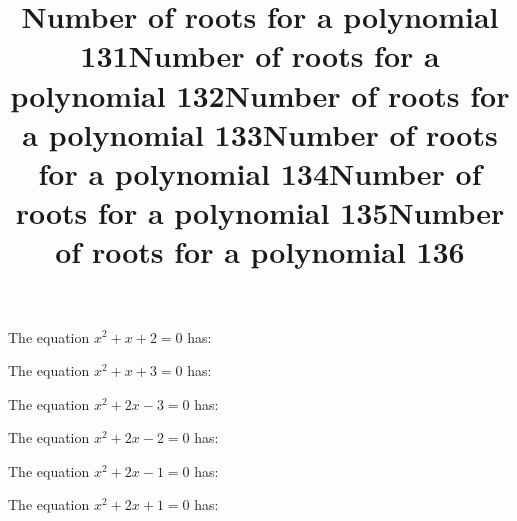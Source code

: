 \documentclass{article}
\begin{document}
\begin{category}
\begin{question}[multichoice]

\end{question}
\begin{question}[multichoice]
\title{Number of roots for a polynomial 131}
The equation $x^{2} + x + 2=0$ has:


\end{question}
\begin{question}[multichoice]
\title{Number of roots for a polynomial 132}
The equation $x^{2} + x + 3=0$ has:


\end{question}
\begin{question}[multichoice]
\title{Number of roots for a polynomial 133}
The equation $x^{2} + 2 x - 3=0$ has:


\end{question}
\begin{question}[multichoice]
\title{Number of roots for a polynomial 134}
The equation $x^{2} + 2 x - 2=0$ has:


\end{question}
\begin{question}[multichoice]
\title{Number of roots for a polynomial 135}
The equation $x^{2} + 2 x - 1=0$ has:


\end{question}
\begin{question}[multichoice]
\title{Number of roots for a polynomial 136}
The equation $x^{2} + 2 x + 1=0$ has:



\end{question}
\end{category}
\end{document}
